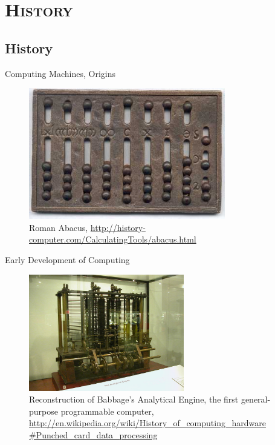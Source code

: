 \documentclass[xcolor=x11names,compress]{beamer}
\renewcommand{\(}{\begin{columns}}
\renewcommand{\)}{\end{columns}}
\newcommand{\<}[1]{\begin{column}{#1}}
\renewcommand{\>}{\end{column}}
\begin{document}
\section{\scshape History}
\subsection{History}
\begin{frame}{Computing Machines, Origins}
\begin{figure}
\includegraphics[height=2.25in,clip]{../figs/RomanAbacus}
\caption{Roman Abacus, \href{http://history-computer.com/CalculatingTools/abacus.html}{http://history-computer.com/CalculatingTools/abacus.html}}
\end{figure}

\end{frame}

\begin{frame}{Early Development of Computing}

\begin{figure}
\includegraphics[height=2in,clip]{../figs/BabbageDiffMachine}
\caption{Reconstruction of Babbage's Analytical Engine, the first general-purpose programmable computer, \href{http://en.wikipedia.org/wiki/History_of_computing_hardware
\#Punched_card_data_processing}{http://en.wikipedia.org/wiki/History\_of\_computing\_hardware
\#Punched\_card\_data\_processing}}
\end{figure}

\end{frame}
\end{document}
